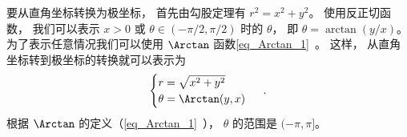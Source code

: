 要从直角坐标转换为极坐标， 首先由勾股定理有 $r^2 = x^2 + y^2$。 使用反正切函数， 我们可以表示 $x >0$ 或 $\theta\in(-\pi/2,\pi/2)$ 时的 $\theta$， 即 $\theta = \arctan(y/x)$。 为了表示任意情况我们可以使用 $\Arctan$ 函数\autoref{eq_Arctan_1}~。 这样， 从直角坐标转到极坐标的转换就可以表示为
\begin{equation}\label{eq_Polar_4}
\begin{cases}
r = \sqrt{x^2 + y^2}\\
\theta = \Arctan(y, x)
\end{cases}~.
\end{equation}
根据 $\Arctan$ 的定义（\autoref{eq_Arctan_1}~）， $\theta$ 的范围是 $(-\pi, \pi]$。
